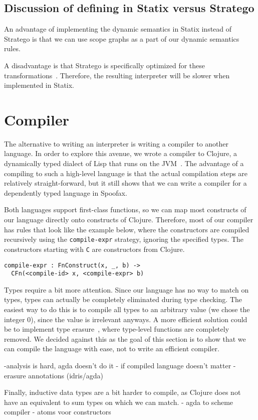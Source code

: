\subsection{Discussion of defining in Statix versus Stratego}

An advantage of implementing the dynamic semantics in Statix instead of Stratego is that we can use scope graphs as a part of our dynamic semantics rules. 

A disadvantage is that Stratego is specifically optimized for these transformations~\cite{fcpmc}. Therefore, the resulting interpreter will be slower when implemented in Statix. 

\section{Compiler}
The alternative to writing an interpreter is writing a compiler to another language. In order to explore this avenue, we wrote a compiler to Clojure, a dynamically typed dialect of Lisp that runs on the JVM~\cite{clojure}. The advantage of a compiling to such a high-level language is that the actual compilation steps are relatively straight-forward, but it still shows that we can write a compiler for a dependently typed language in Spoofax.

Both languages support first-class functions, so we can map most constructs of our language directly onto constructs of Clojure. Therefore, most of our compiler has rules that look like the example below, where the constructors are compiled recursively using the \verb|compile-expr| strategy, ignoring the specified types. The constructors starting with \verb|C| are constructors from Clojure. 
\begin{lstlisting}
compile-expr : FnConstruct(x, _, b) -> 
  CFn(<compile-id> x, <compile-expr> b)
\end{lstlisting}

Types require a bit more attention. Since our language has no way to match on types, types can actually be completely eliminated during type checking. The easiest way to do this is to compile all types to an arbitrary value (we chose the integer 0), since the value is irrelevant anyways. A more efficient solution could be to implement type erasure~\cite[Section 23.6]{tapl}, where type-level functions are completely removed. We decided against this as the goal of this section is to show that we can compile the language with ease, not to write an efficient compiler.

-analysis is hard, agda doesn't do it
- if compiled language doesn't matter
- erasure annotations (idris/agda)



Finally, inductive data types are a bit harder to compile, as Clojure does not have an equivalent to sum types on which we can match. 
- agda to scheme compiler
- atoms voor constructors
